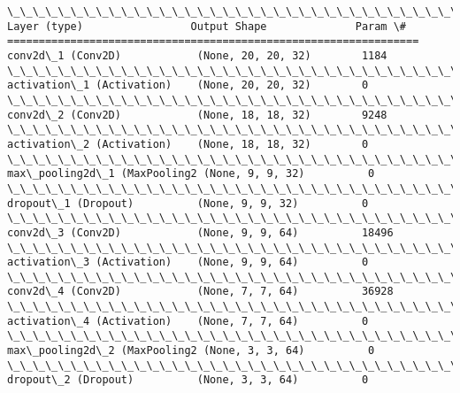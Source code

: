 \documentclass[11pt]{article}
\begin{document}
    \begin{Verbatim}[commandchars=\\\{\}]
\_\_\_\_\_\_\_\_\_\_\_\_\_\_\_\_\_\_\_\_\_\_\_\_\_\_\_\_\_\_\_\_\_\_\_\_\_\_\_\_\_\_\_\_\_\_\_\_\_\_\_\_\_\_\_\_\_\_\_\_\_\_\_\_\_
Layer (type)                 Output Shape              Param \#   
=================================================================
conv2d\_1 (Conv2D)            (None, 20, 20, 32)        1184      
\_\_\_\_\_\_\_\_\_\_\_\_\_\_\_\_\_\_\_\_\_\_\_\_\_\_\_\_\_\_\_\_\_\_\_\_\_\_\_\_\_\_\_\_\_\_\_\_\_\_\_\_\_\_\_\_\_\_\_\_\_\_\_\_\_
activation\_1 (Activation)    (None, 20, 20, 32)        0         
\_\_\_\_\_\_\_\_\_\_\_\_\_\_\_\_\_\_\_\_\_\_\_\_\_\_\_\_\_\_\_\_\_\_\_\_\_\_\_\_\_\_\_\_\_\_\_\_\_\_\_\_\_\_\_\_\_\_\_\_\_\_\_\_\_
conv2d\_2 (Conv2D)            (None, 18, 18, 32)        9248      
\_\_\_\_\_\_\_\_\_\_\_\_\_\_\_\_\_\_\_\_\_\_\_\_\_\_\_\_\_\_\_\_\_\_\_\_\_\_\_\_\_\_\_\_\_\_\_\_\_\_\_\_\_\_\_\_\_\_\_\_\_\_\_\_\_
activation\_2 (Activation)    (None, 18, 18, 32)        0         
\_\_\_\_\_\_\_\_\_\_\_\_\_\_\_\_\_\_\_\_\_\_\_\_\_\_\_\_\_\_\_\_\_\_\_\_\_\_\_\_\_\_\_\_\_\_\_\_\_\_\_\_\_\_\_\_\_\_\_\_\_\_\_\_\_
max\_pooling2d\_1 (MaxPooling2 (None, 9, 9, 32)          0         
\_\_\_\_\_\_\_\_\_\_\_\_\_\_\_\_\_\_\_\_\_\_\_\_\_\_\_\_\_\_\_\_\_\_\_\_\_\_\_\_\_\_\_\_\_\_\_\_\_\_\_\_\_\_\_\_\_\_\_\_\_\_\_\_\_
dropout\_1 (Dropout)          (None, 9, 9, 32)          0         
\_\_\_\_\_\_\_\_\_\_\_\_\_\_\_\_\_\_\_\_\_\_\_\_\_\_\_\_\_\_\_\_\_\_\_\_\_\_\_\_\_\_\_\_\_\_\_\_\_\_\_\_\_\_\_\_\_\_\_\_\_\_\_\_\_
conv2d\_3 (Conv2D)            (None, 9, 9, 64)          18496     
\_\_\_\_\_\_\_\_\_\_\_\_\_\_\_\_\_\_\_\_\_\_\_\_\_\_\_\_\_\_\_\_\_\_\_\_\_\_\_\_\_\_\_\_\_\_\_\_\_\_\_\_\_\_\_\_\_\_\_\_\_\_\_\_\_
activation\_3 (Activation)    (None, 9, 9, 64)          0         
\_\_\_\_\_\_\_\_\_\_\_\_\_\_\_\_\_\_\_\_\_\_\_\_\_\_\_\_\_\_\_\_\_\_\_\_\_\_\_\_\_\_\_\_\_\_\_\_\_\_\_\_\_\_\_\_\_\_\_\_\_\_\_\_\_
conv2d\_4 (Conv2D)            (None, 7, 7, 64)          36928     
\_\_\_\_\_\_\_\_\_\_\_\_\_\_\_\_\_\_\_\_\_\_\_\_\_\_\_\_\_\_\_\_\_\_\_\_\_\_\_\_\_\_\_\_\_\_\_\_\_\_\_\_\_\_\_\_\_\_\_\_\_\_\_\_\_
activation\_4 (Activation)    (None, 7, 7, 64)          0         
\_\_\_\_\_\_\_\_\_\_\_\_\_\_\_\_\_\_\_\_\_\_\_\_\_\_\_\_\_\_\_\_\_\_\_\_\_\_\_\_\_\_\_\_\_\_\_\_\_\_\_\_\_\_\_\_\_\_\_\_\_\_\_\_\_
max\_pooling2d\_2 (MaxPooling2 (None, 3, 3, 64)          0         
\_\_\_\_\_\_\_\_\_\_\_\_\_\_\_\_\_\_\_\_\_\_\_\_\_\_\_\_\_\_\_\_\_\_\_\_\_\_\_\_\_\_\_\_\_\_\_\_\_\_\_\_\_\_\_\_\_\_\_\_\_\_\_\_\_
dropout\_2 (Dropout)          (None, 3, 3, 64)          0         

\end{Verbatim}
\end{document}
